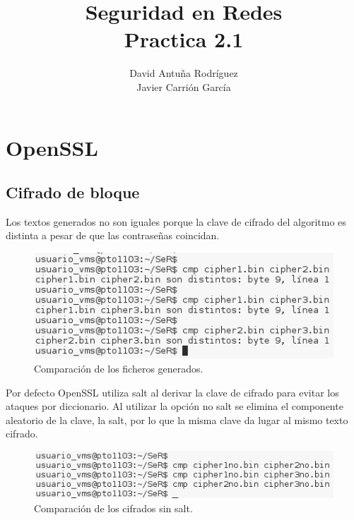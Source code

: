 \documentclass[11pt]{article}
\title{\Large Seguridad en Redes\\Practica 2.1}
\author{David Antuña Rodríguez\\Javier Carrión García}
\date{}
\begin{document}
  \raggedright

  \maketitle
  \newpage

  \section{OpenSSL}
    \subsection{Cifrado de bloque}
      \par
      Los textos generados no son iguales porque la clave de cifrado del algoritmo es distinta a pesar de que las contraseñas coincidan.
      \begin{figure}[!ht]
        \centering
        \includegraphics[width = .6\textwidth]{cmp_ciphers}
        \caption{Comparación de los ficheros generados.}
      \end{figure}

      \bigskip
      \par
      Por defecto OpenSSL utiliza salt al derivar la clave de cifrado para evitar los ataques por diccionario. Al utilizar la
      opción no salt se elimina el componente aleatorio de la clave, la salt, por lo que la misma clave da lugar al mismo texto cifrado.
      \begin{figure}[!ht]
        \centering
        \includegraphics[width = .7\textwidth]{cmp_ciphers_nosalt}
        \caption{Comparación de los cifrados sin salt.}
      \end{figure}
\end{document}
